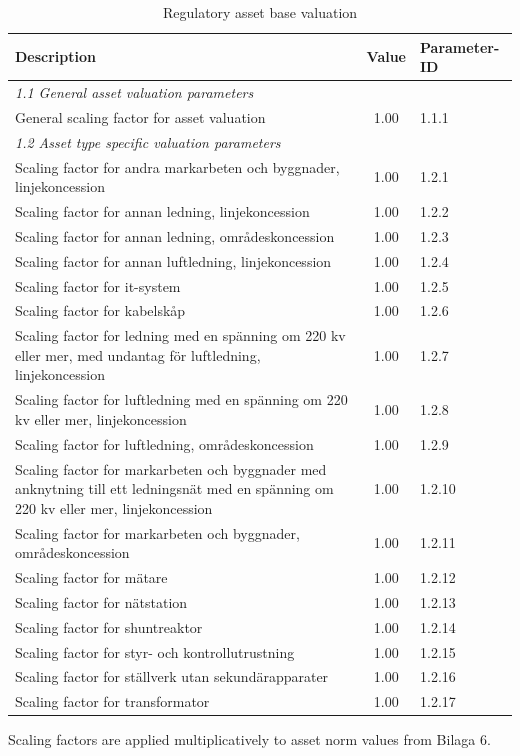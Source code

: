 \begin{table}[H]
\centering
\footnotesize
\begin{threeparttable}
\caption{Regulatory asset base valuation}
\label{tab:asset-scaling}
\begin{tabular}{@{}p{9cm}cl@{}}
\toprule
\textbf{Description} & \textbf{Value} & \textbf{Parameter-ID} \\
\midrule
\multicolumn{3}{l}{\textit{1.1 General asset valuation parameters}} \\
General scaling factor for asset valuation\tnote{a} & 1.00 & 1.1.1 \\
\midrule
\multicolumn{3}{l}{\textit{1.2  Asset type specific valuation parameters}} \\
Scaling factor for andra markarbeten och byggnader, linjekoncession & 1.00 & 1.2.1 \\
Scaling factor for annan ledning, linjekoncession & 1.00 & 1.2.2 \\
Scaling factor for annan ledning, områdeskoncession & 1.00 & 1.2.3 \\
Scaling factor for annan luftledning, linjekoncession & 1.00 & 1.2.4 \\
Scaling factor for it-system & 1.00 & 1.2.5 \\
Scaling factor for kabelskåp & 1.00 & 1.2.6 \\
Scaling factor for ledning med en spänning om 220 kv eller mer, med undantag för luftledning, linjekoncession & 1.00 & 1.2.7 \\
Scaling factor for luftledning med en spänning om 220 kv eller mer, linjekoncession & 1.00 & 1.2.8 \\
Scaling factor for luftledning, områdeskoncession & 1.00 & 1.2.9 \\
Scaling factor for markarbeten och byggnader med anknytning till ett ledningsnät med en spänning om 220 kv eller mer, linjekoncession & 1.00 & 1.2.10 \\
Scaling factor for markarbeten och byggnader, områdeskoncession & 1.00 & 1.2.11 \\
Scaling factor for mätare & 1.00 & 1.2.12 \\
Scaling factor for nätstation & 1.00 & 1.2.13 \\
Scaling factor for shuntreaktor & 1.00 & 1.2.14 \\
Scaling factor for styr- och kontrollutrustning & 1.00 & 1.2.15 \\
Scaling factor for ställverk utan sekundärapparater & 1.00 & 1.2.16 \\
Scaling factor for transformator & 1.00 & 1.2.17 \\
\bottomrule
\end{tabular}
\begin{tablenotes}
\item[a] Scaling factors are applied multiplicatively to asset norm values from Bilaga 6.
\end{tablenotes}
\end{threeparttable}
\end{table}

